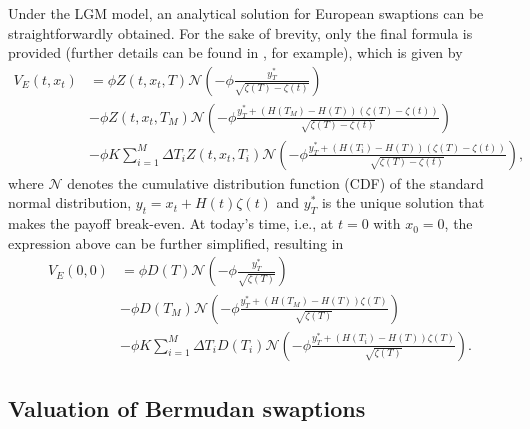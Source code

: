         Under the LGM model, an analytical solution for European swaptions can be straightforwardly obtained. For the sake of brevity, only the final formula is provided (further details can be found in \cite{hagan2002}, for example), which is given by
        \begin{equation}\label{eq:IRS_European_t}
        \begin{aligned}
            V_E(t, x_t)  &= \phi Z(t, x_t, T)\mathcal{N}\left(-\phi\frac{y_T^*}{\sqrt{\zeta(T) - \zeta(t)}}\right) \\
                    &- \phi Z(t, x_t, T_M)\mathcal{N}\left(-\phi\frac{y_T^* + (H(T_M) - H(T))(\zeta(T) - \zeta(t))}{\sqrt{\zeta(T) - \zeta(t)}}\right) \\
                    &- \phi K \sum_{i=1}^M \Delta T_i Z(t, x_t, T_i)\mathcal{N}\left(-\phi\frac{y_T^* + (H(T_i) - H(T))(\zeta(T) - \zeta(t))}{\sqrt{\zeta(T) - \zeta(t)}}\right),
        \end{aligned}
        \end{equation}
        where $\mathcal{N}$ denotes the cumulative distribution function (CDF) of the standard normal distribution, $y_t = x_t + H(t)\zeta(t)$ and $y_T^*$ is the unique solution that makes the payoff break-even. At today's time, i.e., at $t=0$ with $x_0=0$, the expression above can be further simplified, resulting in
        \begin{equation}\label{eq:IRS_European}
        \begin{aligned}
            V_E(0, 0)  &= \phi D(T)\mathcal{N}\left(-\phi\frac{y_T^*}{\sqrt{\zeta(T)}}\right) \\
                    &- \phi D(T_M)\mathcal{N}\left(-\phi\frac{y_T^* + (H(T_M) - H(T))\zeta(T)}{\sqrt{\zeta(T)}}\right) \\
                    &- \phi K \sum_{i=1}^M \Delta T_i D(T_i)\mathcal{N}\left(-\phi\frac{y_T^* + (H(T_i) - H(T))\zeta(T)}{\sqrt{\zeta(T)}}\right).
        \end{aligned}
        \end{equation}


    \subsection{Valuation of Bermudan swaptions}
    
